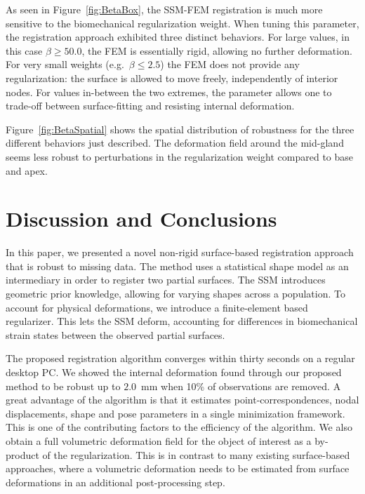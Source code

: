 \documentclass[journal]{IEEEtran}
\newcommand\redout{\bgroup\markoverwith{\textcolor{red}{\rule[.5ex]{2pt}{0.4pt}}}\ULon}
\begin{document}
As seen in Figure~\ref{fig:BetaBox}, the SSM-FEM registration is much more sensitive to the biomechanical regularization weight. When tuning this parameter, the registration approach exhibited three distinct behaviors. For large values, in this case $\beta\geq50.0$, the FEM is essentially rigid, allowing no further deformation. For very small weights (e.g.~$\beta\leq2.5$) the FEM does not provide any regularization: the surface is allowed to move freely, independently of interior nodes. For values in-between the two extremes, the parameter allows one to trade-off between surface-fitting and resisting internal deformation.

Figure~\ref{fig:BetaSpatial} shows the spatial distribution of robustness for the three different behaviors just described. The deformation field around the mid-gland seems less robust to perturbations in the regularization weight compared to base and apex. 

\section{Discussion and Conclusions}
In this paper, we presented a novel non-rigid surface-based registration approach that is robust to missing data.  The method uses a statistical shape model as an intermediary in order to register two partial surfaces.  The SSM introduces geometric prior knowledge, allowing for varying shapes across a population.  To account for physical deformations, we introduce a finite-element based regularizer.  This lets the SSM deform, accounting for differences in biomechanical strain states between the observed partial surfaces.

The proposed registration algorithm converges within thirty seconds on a regular desktop PC. We showed the internal deformation found through our proposed method to be robust up to $2.0$~mm when 10\% of observations are removed. A great advantage of the algorithm is that it estimates point-correspondences, nodal displacements, shape and pose parameters in a single minimization framework.  This is one of the contributing factors to the efficiency of the algorithm.  We also obtain a full volumetric deformation field for the object of interest as a by-product of the regularization.  This is in contrast to many existing surface-based approaches, where a volumetric deformation needs to be estimated from surface deformations in an additional post-processing step.
\end{document}
